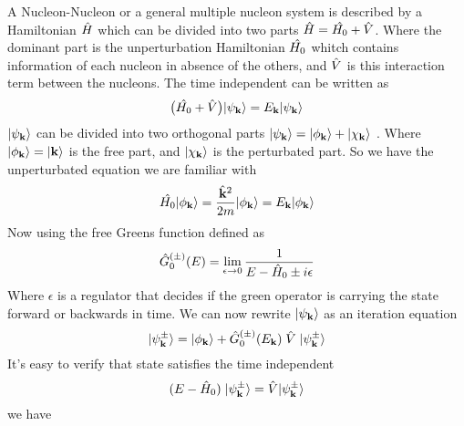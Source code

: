 A Nucleon-Nucleon or a general multiple nucleon system is described by a Hamiltonian 
$\hat{H}$ which can be divided into two parts
$\hat{H}=\hat{H_0}+\hat{V}$. Where the dominant part is the unperturbation Hamiltonian $\hat{H_0}$ whitch
contains information of each nucleon in absence of the others, and $\hat{V}$ is this
interaction term between the nucleons. The time independent {\SE} can be written as
%                                                 
\begin{equation}\label{eq:timeindependentSL}
\big( \op{H_0} +\op{V} \big)\ket{\psi_{\bf k}} = E_{\bf k} \ket{\psi_{\bf k}} 
\end{equation}
%                                                 
$|\psi_{\bf k}\rangle$ can be divided into two orthogonal parts
$|\psi_{\bf k}\rangle=|\phi_{\bf k}\rangle+|\chi_{\bf k}\rangle$ . Where $|\phi_{\bf k}\rangle=|{\bf k}\rangle$
is the free part, and $|\chi_{\bf k}\rangle$ is the perturbated part.
So we have the unperturbated equation
we are familiar with
%                                                 
\begin{equation}
\hat{H_0}|\phi_{\bf k}\rangle=\frac{\hat{{\bf k}}^2}{2m}|\phi_{\bf k}\rangle=E_{\bf k}|\phi_{\bf k}\rangle
\end{equation} 
%                                                 
Now using the free Greens function defined as
%                                                 
\begin{equation}\label{eq:fgreen}
\op{G}^{(\pm)}_0(E)=\lim_{\epsilon \rightarrow 0} \inv{E-\op{H}_0\pm i\epsilon}
\end{equation}
%                                                 
Where $\epsilon$ is a regulator that decides if the green operator is carrying the state
forward or backwards in time.
We can now rewrite $|\psi_{\bf k}\rangle$ as an iteration equation
\begin{equation}\label{eq:ket}
\ket{\psi_{\bf k}^{\pm}}=\ket{\phi_{\bf k}}+\op{G}^{(\pm)}_0(E_{\bf k})\;\op{V}\;\ket{\psi_{\bf k}^{\pm}}
\end{equation}
%                                                 
It's easy to verify that state satisfies the time independent \SE 
%                                                 
\begin{equation}
(E-\hat{H}_0)\;|\psi_{\bf k}^{\pm}\rangle=\hat{V}|\psi_{\bf k}^{\pm}\rangle
\end{equation} 
%                                                 
we have
%                                                 
